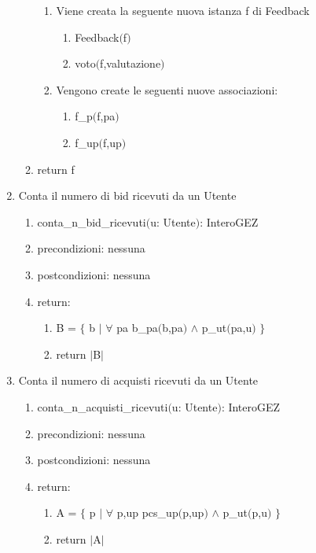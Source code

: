\documentclass{article}
\begin{document}
\begin{enumerate}
\begin{enumerate}
\begin{enumerate}
            \item Viene creata la seguente nuova istanza f di Feedback
            \begin{enumerate}
                \item Feedback$($f$)$
                \item voto$($f,valutazione$)$
            \end{enumerate}
            \item Vengono create le seguenti nuove associazioni:
            \begin{enumerate}
                \item f\_p$($f,pa$)$
                \item f\_up$($f,up$)$
            \end{enumerate}
        \end{enumerate}
        \item return f
    \end{enumerate}
    \item Conta il numero di bid ricevuti da un Utente
    \begin{enumerate}
        \item conta\_n\_bid\_ricevuti$($u: Utente$)$: InteroGEZ
        \item precondizioni: nessuna
        \item postcondizioni: nessuna
        \item return:
        \begin{enumerate}
            \item B = $\{$ b $|$ $\forall$ pa b\_pa$($b,pa$)$ $\land$ p\_ut$($pa,u$)$ $\}$
            \item return $|$B$|$
        \end{enumerate}
    \end{enumerate}
    \item Conta il numero di acquisti ricevuti da un Utente
    \begin{enumerate}
        \item conta\_n\_acquisti\_ricevuti$($u: Utente$)$: InteroGEZ
        \item precondizioni: nessuna
        \item postcondizioni: nessuna
        \item return:
        \begin{enumerate}
            \item A = $\{$ p $|$ $\forall$ p,up pcs\_up$($p,up$)$ $\land$ p\_ut$($p,u$)$ $\}$
            \item return $|$A$|$

\end{enumerate}
\end{enumerate}
\end{enumerate}
\end{document}
